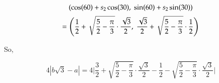 \documentclass[11pt,a4paper]{scrartcl}
\begin{document}
\begin{solution}
\[(\cos(60)+s_2 \cos(30) , \hspace{1mm} \sin(60)+s_2 \sin(30))\]
\[=\Bigg(\frac{1}{2}+\sqrt{\frac{5}{2}-\frac{\pi}{3}} \cdot \frac{\sqrt{3}}{2}, \hspace{1mm} \frac{\sqrt{3}}{2}+\sqrt{\frac{5}{2}- \frac{\pi}{3}} \cdot \frac{1}{2}\Bigg)\]

So, 

\[4 |b \sqrt{3}-a|=4 \Bigg|\frac{3}{2}+\sqrt{\frac{5}{2}- \frac{\pi}{3}} \cdot \frac{\sqrt{3}}{2}-\frac{1}{2}-\sqrt{\frac{5}{2}- \frac{\pi}{3}} \cdot \frac{\sqrt{3}}{2}\Bigg|\]


\begin{center}
    


\begin{tikzpicture}[x=0.75pt,y=0.75pt,yscale=-1,xscale=1]


\end{tikzpicture}
\end{center}
\end{solution}
\end{document}
